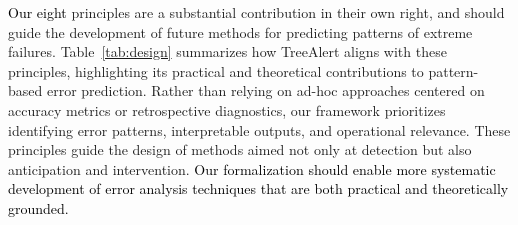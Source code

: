 \documentclass[12pt]{article}
\newcommand{\galit}[1]{\textcolor{black}{#1}}
\begin{document}
\galit{Our eight} %
principles %
are a substantial contribution in their own right, and should guide the development of future methods for predicting patterns of extreme failures. Table~\ref{tab:design} summarizes how TreeAlert aligns with these principles, highlighting its practical and theoretical contributions to pattern-based error prediction. Rather than relying on ad-hoc approaches centered on accuracy metrics or retrospective diagnostics, our framework prioritizes identifying error patterns, interpretable outputs, and operational relevance. These principles guide the design of methods aimed not only at detection but also anticipation and intervention. \galit{Our  formalization %
should enable more systematic development of error analysis techniques that are both practical and theoretically grounded.} %


\end{document}
